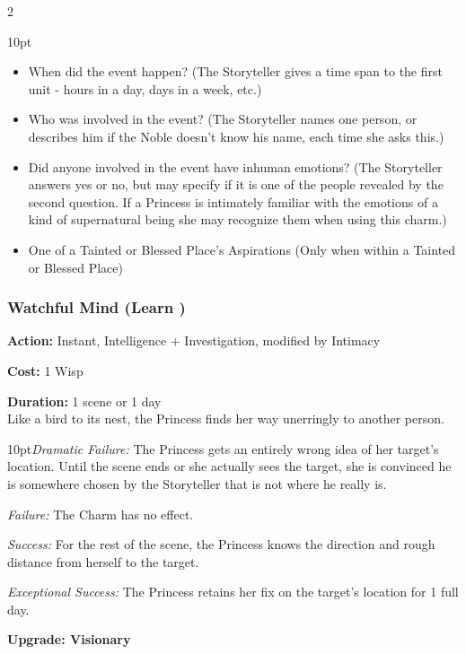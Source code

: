 \begin{multicols}{2}
\begin{myindentpar}{10pt}
\begin{itemize}
	\item When did the event happen? (The Storyteller gives a time span to the first unit - hours in a day, days
in a week, etc.)
	\item Who was involved in the event? (The Storyteller names one person, or describes him if the Noble
doesn't know his name, each time she asks this.)
    \item Did anyone involved in the event have inhuman emotions? (The Storyteller answers yes or no, but may specify if it is one of the people revealed by the second question. If a Princess is intimately familiar with the emotions of a kind of supernatural being she may recognize them when using this charm.)
	\item One of a Tainted or Blessed Place's Aspirations (Only when within a Tainted or Blessed Place) 
	
	\end{itemize}
	
\end{myindentpar}

\subsubsection*{Watchful Mind (Learn \textbullet\textbullet)}

\noindent \textbf{Action:} Instant, Intelligence + Investigation, modified by Intimacy

\noindent \textbf{Cost:} 1 Wisp

\noindent \textbf{Duration:} 1 scene or 1 day \\

Like a bird to its nest, the Princess finds her way unerringly to another person.

\begin{myindentpar}{10pt}\emph{Dramatic Failure:} The Princess gets an entirely wrong idea of her target's location. Until the scene ends or she actually sees the target, she is convinced he is somewhere chosen by the Storyteller that is not where he really is.

    \emph{Failure:} The Charm has no effect.

    \emph{Success:} For the rest of the scene, the Princess knows the direction and rough distance from herself to the target.

    \emph{Exceptional Success:} The Princess retains her fix on the target's location for 1 full day.

\textbf{Upgrade: Visionary}


\end{myindentpar}
\end{multicols}
